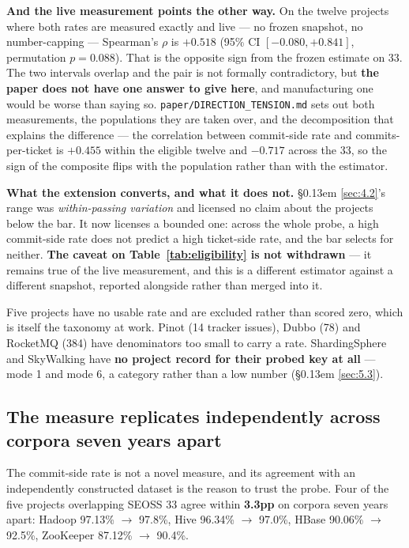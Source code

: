 \documentclass[conference]{IEEEtran}
\begin{document}
\textbf{And the live measurement points the other way.} On the twelve projects where both rates are measured exactly and live --- no frozen snapshot, no number-capping --- Spearman's $\rho$ is \textbf{$+0.518$} (95\% CI $[-0.080, +0.841]$, permutation $p = 0.088$). That is the opposite sign from the frozen estimate on 33. The two intervals overlap and the pair is not formally contradictory, but \textbf{the paper does not have one answer to give here}, and manufacturing one would be worse than saying so. \texttt{paper/\allowbreak{}DIRECTION\_\allowbreak{}TENSION.\allowbreak{}md} sets out both measurements, the populations they are taken over, and the decomposition that explains the difference --- the correlation between commit-side rate and commits-per-ticket is \textbf{$+0.455$} within the eligible twelve and \textbf{$-0.717$} across the 33, so the sign of the composite flips with the population rather than with the estimator.

\textbf{What the extension converts, and what it does not.} \S\kern0.13em \ref{sec:4.2}'s range was \emph{within-passing variation} and licensed no claim about the projects below the bar. It now licenses a bounded one: across the whole probe, a high commit-side rate does not predict a high ticket-side rate, and the bar selects for neither. \textbf{The caveat on Table~\ref{tab:eligibility} is not withdrawn} --- it remains true of the live measurement, and this is a different estimator against a different snapshot, reported alongside rather than merged into it.

Five projects have no usable rate and are excluded rather than scored zero, which is itself the taxonomy at work. Pinot (14 tracker issues), Dubbo (78) and RocketMQ (384) have denominators too small to carry a rate. ShardingSphere and SkyWalking have \textbf{no project record for their probed key at all} --- mode 1 and mode 6, a category rather than a low number (\S\kern0.13em \ref{sec:5.3}).

\subsection{The measure replicates independently across corpora seven years apart}
\label{sec:4.4}

The commit-side rate is not a novel measure, and its agreement with an independently constructed dataset is the reason to trust the probe. Four of the five projects overlapping SEOSS 33 agree within \textbf{3.3pp} on corpora seven years apart: Hadoop 97.13\% $\rightarrow$ 97.8\%, Hive 96.34\% $\rightarrow$ 97.0\%, HBase 90.06\% $\rightarrow$ 92.5\%, ZooKeeper 87.12\% $\rightarrow$ 90.4\%.
\end{document}

